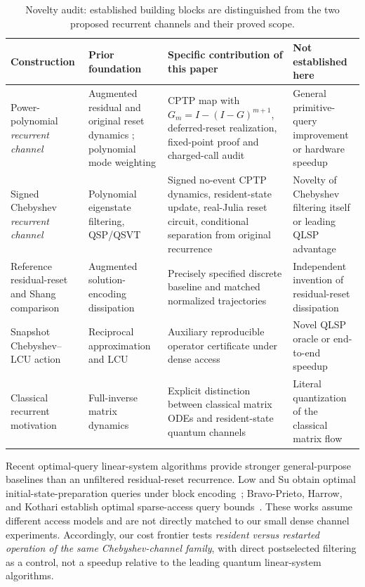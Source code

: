\documentclass{ieeeaccess}
\begin{document}
\begin{table}[!tbp]\small\centering
\caption{Novelty audit: established building blocks are distinguished from the two proposed recurrent channels and their proved scope.}
\label{tab:novelty}
\setlength{\tabcolsep}{4.5pt}\begin{tabular}{>{\raggedright\arraybackslash}p{}>{\raggedright\arraybackslash}p{}>{\raggedright\arraybackslash}p{}>{\raggedright\arraybackslash}p{}}\toprule
Construction & Prior foundation & Specific contribution of this paper & Not established here \\\midrule
Power-polynomial \emph{recurrent channel} & Augmented residual and original reset dynamics \cite{shang}; polynomial mode weighting \cite{r4} & CPTP map with $G_m=I-(I-G)^{m+1}$, deferred-reset realization, fixed-point proof and charged-call audit & General primitive-query improvement or hardware speedup \\
Signed Chebyshev \emph{recurrent channel} & Polynomial eigenstate filtering, QSP/QSVT \cite{filter,r3} & Signed no-event CPTP dynamics, resident-state update, real-Julia reset circuit, conditional separation from original recurrence & Novelty of Chebyshev filtering itself or leading QLSP advantage \\
Reference residual-reset and Shang comparison & Augmented solution-encoding dissipation \cite{shang} & Precisely specified discrete baseline and matched normalized trajectories & Independent invention of residual-reset dissipation \\
Snapshot Chebyshev--LCU action & Reciprocal approximation and LCU \cite{r2,r3} & Auxiliary reproducible operator certificate under dense access & Novel QLSP oracle or end-to-end speedup \\
Classical recurrent motivation & Full-inverse matrix dynamics \cite{r4} & Explicit distinction between classical matrix ODEs and resident-state quantum channels & Literal quantization of the classical matrix flow \\
\bottomrule\end{tabular}
\end{table}



Recent optimal-query linear-system algorithms provide stronger general-purpose baselines than an unfiltered residual-reset recurrence. Low and Su obtain optimal initial-state-preparation queries under block encoding~\cite{lowsu2026}; Bravo-Prieto, Harrow, and Kothari establish optimal sparse-access query bounds~\cite{bravo2026}. These works assume different access models and are not directly matched to our small dense channel experiments. Accordingly, our cost frontier tests \emph{resident versus restarted operation of the same Chebyshev-channel family}, with direct postselected filtering as a control, not a speedup relative to the leading quantum linear-system algorithms.
\end{document}
